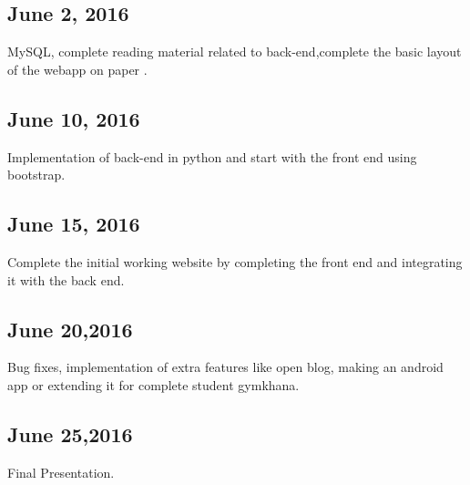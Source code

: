 \documentclass{article}
\begin{document}
\subsection{June 2, 2016}
MySQL, complete reading material related to back-end,complete the basic layout of the webapp on paper .
\subsection{June 10, 2016}
Implementation of back-end in python and start with the front end using bootstrap.
\subsection{June 15, 2016}
Complete the initial working website by completing the front end and integrating it with the back end.
\subsection{June 20,2016}
Bug fixes, implementation of extra features like open blog, making an android app or extending it for complete student gymkhana.
\subsection{June 25,2016}
Final Presentation.
\end{document}
